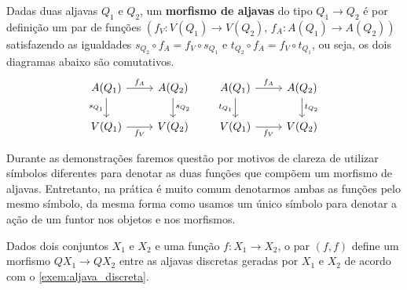 \begin{defin}\label{defin:morfismo_aljavas}
    Dadas duas aljavas $Q_1$ e $Q_2$, um \textbf{morfismo de aljavas} do tipo $Q_1 \to Q_2$ é por definição um par de funções $(f_V: V(Q_1) \to V(Q_2),\, f_A: A(Q_1) \to A(Q_2))$ satisfazendo as igualdades $s_{Q_2} \circ f_A = f_V \circ s_{Q_1}$ e $t_{Q_2} \circ f_A = f_V \circ t_{Q_1}$, ou seja, os dois diagramas abaixo são comutativos.
    \begin{displaymath}
        \begin{tikzcd}
            A(Q_1)
            \arrow[r, "f_A"]
            \arrow[d, "s_{Q_1}" swap]
            & A(Q_2)
            \arrow[d, "s_{Q_2}"]
            \\ V(Q_1)
            \arrow[r, "f_V" swap]
            & V(Q_2)
        \end{tikzcd}
        \qquad
        \begin{tikzcd}
            A(Q_1)
            \arrow[r, "f_A"]
            \arrow[d, "t_{Q_1}" swap]
            & A(Q_2)
            \arrow[d, "t_{Q_2}"]
            \\ V(Q_1)
            \arrow[r, "f_V" swap]
            & V(Q_2)
        \end{tikzcd}
    \end{displaymath}
\end{defin}

Durante as demonstrações faremos questão por motivos de clareza de utilizar símbolos diferentes para denotar as duas funções que compõem um morfismo de aljavas.
Entretanto, na prática é muito comum denotarmos ambas as funções pelo mesmo símbolo, da mesma forma como usamos um único símbolo para denotar a ação de um funtor nos objetos e nos morfismos.

\begin{exem}
    Dados dois conjuntos $X_1$ e $X_2$ e uma função $f: X_1 \to X_2$, o par $(f,f)$ define um morfismo $QX_1 \to QX_2$ entre as aljavas discretas geradas por $X_1$ e $X_2$ de acordo com o \cref{exem:aljava_discreta}.
\end{exem}

